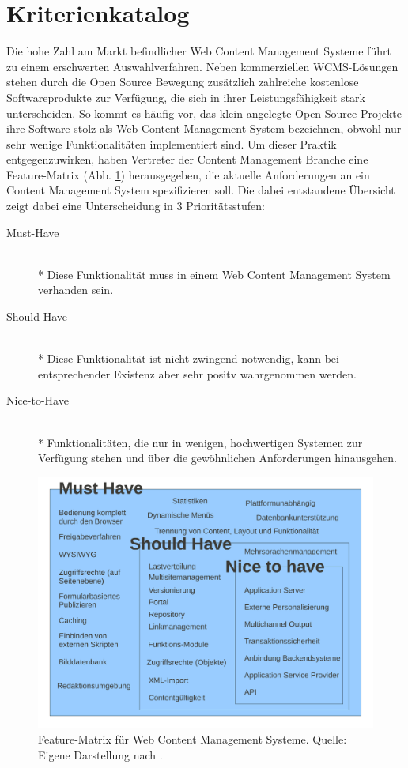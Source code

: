 \section{Kriterienkatalog}
Die hohe Zahl am Markt befindlicher Web Content Management Systeme führt zu einem erschwerten Auswahlverfahren. Neben kommerziellen WCMS-Lösungen stehen durch die Open Source Bewegung zusätzlich zahlreiche kostenlose Softwareprodukte zur Verfügung, die sich in ihrer Leistungsfähigkeit stark unterscheiden.
So kommt es häufig vor, das klein angelegte Open Source Projekte ihre Software stolz als Web Content Management System bezeichnen, obwohl nur sehr wenige Funktionalitäten implementiert sind.
Um dieser Praktik entgegenzuwirken, haben Vertreter der Content Management Branche eine Feature-Matrix (Abb. \ref{featurematrix}) herausgegeben, die aktuelle Anforderungen an ein Content Management System spezifizieren soll. Die dabei entstandene Übersicht zeigt dabei eine Unterscheidung in 3 Prioritätsstufen:
\begin{description}
\item[Must-Have]\mbox{~}\\*
Diese Funktionalität muss in einem Web Content Management System verhanden sein.
\item[Should-Have]\mbox{~}\\*
Diese Funktionalität ist nicht zwingend notwendig, kann bei entsprechender Existenz aber sehr positv wahrgenommen werden.
\item[Nice-to-Have]\mbox{~}\\*
Funktionalitäten, die nur in wenigen, hochwertigen Systemen zur Verfügung stehen und über die gewöhnlichen Anforderungen hinausgehen.
\end{description}


\begin{figure}[!h]
\begin{center}
\includegraphics[scale=0.5]{images/analyse/featurematrix.pdf}
\caption[Feature-Matrix für Web Content Management Systeme]{Feature-Matrix für Web Content Management Systeme. Quelle: Eigene Darstellung nach \citep{jdkmatrix}.}
\label{featurematrix}
\end{center}
\end{figure}

